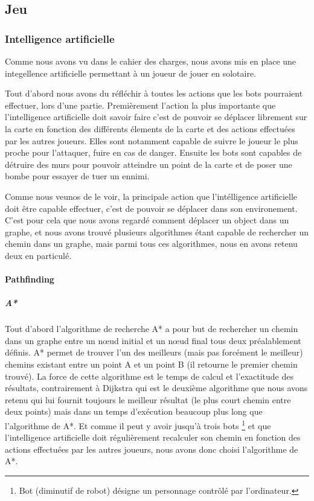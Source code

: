 \subsection{Jeu}
	\subsubsection{Intelligence artificielle}
		Comme nous avons vu dans le cahier des charges, nous avons mis en place une integellence artificielle permettant à un joueur de jouer en solotaire.
	
		Tout d'abord nous avons du réfléchir à toutes les actions que les bots pourraient effectuer, lors d'une partie. Premièrement l'action la plus importante que l'intelligence artificielle doit savoir faire c'est de pouvoir se déplacer librement sur la carte en fonction des différents élements de la carte et des actions effectuées par les autres joueurs. Elles sont notamment capable de suivre le joueur le plus proche pour l'attaquer, fuire en cas de danger.  Ensuite les bots sont capables de détruire des murs pour pouvoir atteindre un point de la carte et  de poser une bombe pour essayer de tuer un ennimi.
	
		Comme nous veunos de le voir, la principale action que l'intélligence artificielle doit être capable effectuer, c'est de pouvoir se déplacer dans son environement. C'est pour cela que nous avons regardé comment déplacer un object dans un graphe, et nous avons trouvé plusieurs algorithmes étant capable de rechercher un chemin dans un graphe, mais parmi tous ces algorithmes, nous en avons retenu deux en particulé.
		
		\paragraph{Pathfinding}
		
		\subparagraph{A*\\}
		
			Tout d'abord l'algorithme de recherche A* a pour but de rechercher un chemin
			dans un graphe entre un nœud initial et un nœud final tous deux préalablement
			définis. A* permet de trouver l'un des meilleurs (mais pas forcément le
			meilleur) chemins existant entre un point A et un point B (il retourne le premier chemin trouvé). La force de cette algorithme est le temps de calcul et l'exactitude des résultats, contrairement à Dijkstra qui est le deuxième algorithme que nous avons retenu qui lui fournit toujours le meilleur résultat (le plus court chemin entre deux points) mais dans un temps d'exécution beaucoup plus long que l'algorithme de A*. Et comme il peut y avoir jusqu'à trois bots \footnote{Bot (diminutif de robot) désigne un personnage contrôlé par l'ordinateur.} et que l'intelligence artificielle doit régulièrement recalculer son chemin en fonction des actions effectuées par les autres joueurs, nous avons donc choisi l'algorithme de A*.
		
